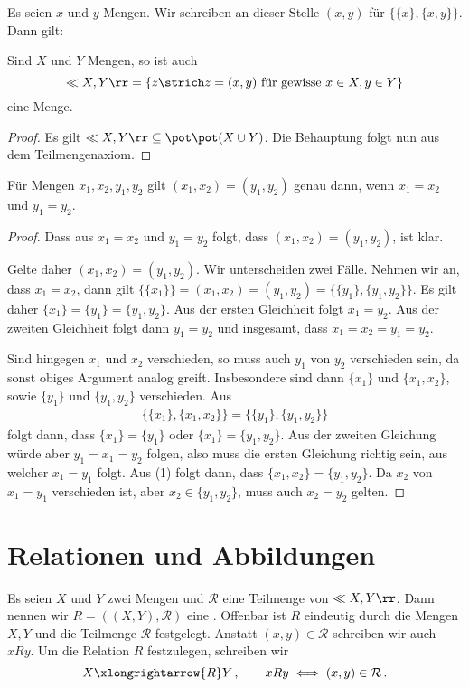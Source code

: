 Es seien $x$ und $y$ Mengen. Wir schreiben an dieser Stelle $(x,y)$ für $\{\{x\},\{x,y\}\}$. Dann gilt:

\begin{lemma}
Sind $X$ und $Y$ Mengen, so ist auch
\[
\ll X,Y\rr=\left\{z\strich z=(x,y)\text{ für gewisse }x\in X,y\in Y\right\}
\]
eine Menge.
\end{lemma}
\begin{proof}
Es gilt $\ll X,Y\rr\subseteq\pot\pot(X\cup Y)$. Die Behauptung folgt nun aus dem Teilmengenaxiom.
\end{proof}

\begin{lemma}
Für Mengen $x_1,x_2,y_1,y_2$ gilt $(x_1,x_2)=(y_1,y_2)$ genau dann, wenn $x_1=x_2$ und $y_1=y_2$.
\end{lemma}
\begin{proof}
Dass aus $x_1=x_2$ und $y_1=y_2$ folgt, dass $(x_1,x_2)=(y_1,y_2)$, ist klar.

Gelte daher $(x_1,x_2)=(y_1,y_2)$. Wir unterscheiden zwei Fälle. Nehmen wir an, dass $x_1=x_2$, dann gilt $\{\{x_1\}\}=(x_1,x_2)=(y_1,y_2)=\{\{y_1\},\{y_1,y_2\}\}$. Es gilt daher $\{x_1\}=\{y_1\}=\{y_1,y_2\}$. Aus der ersten Gleichheit folgt $x_1=y_2$. Aus der zweiten Gleichheit folgt dann $y_1=y_2$ und insgesamt, dass $x_1=x_2=y_1=y_2$.

Sind hingegen $x_1$ und $x_2$ verschieden, so muss auch $y_1$ von $y_2$ verschieden sein, da sonst obiges Argument analog greift. Insbesondere sind dann $\{x_1\}$ und $\{x_1,x_2\}$, sowie $\{y_1\}$ und $\{y_1,y_2\}$ verschieden. Aus
\begin{align}
\{\{x_1\},\{x_1,x_2\}\}=\{\{y_1\},\{y_1,y_2\}\}
\end{align}
folgt dann, dass $\{x_1\}=\{y_1\}$ oder $\{x_1\}=\{y_1,y_2\}$. Aus der zweiten Gleichung würde aber $y_1=x_1=y_2$ folgen, also muss die ersten Gleichung richtig sein, aus welcher $x_1=y_1$ folgt. Aus (1) folgt dann, dass $\{x_1,x_2\}=\{y_1,y_2\}$. Da $x_2$ von $x_1=y_1$ verschieden ist, aber $x_2\in\{y_1,y_2\}$, muss auch $x_2=y_2$ gelten.
\end{proof}

\section{Relationen und Abbildungen}

Es seien $X$ und $Y$ zwei Mengen und $\mathcal{R}$ eine Teilmenge von $\ll X,Y\rr$. Dann nennen wir $R=((X,Y),\mathcal{R})$ eine . Offenbar ist $R$ eindeutig durch die Mengen $X,Y$ und die Teilmenge $\mathcal{R}$ festgelegt. Anstatt $(x,y)\in\mathcal{R}$ schreiben wir auch $xRy$. Um die Relation $R$ festzulegen, schreiben wir
\[
X\xlongrightarrow{R}Y\,,\qquad xRy\iff(x,y)\in\mathcal{R}\,.
\]

